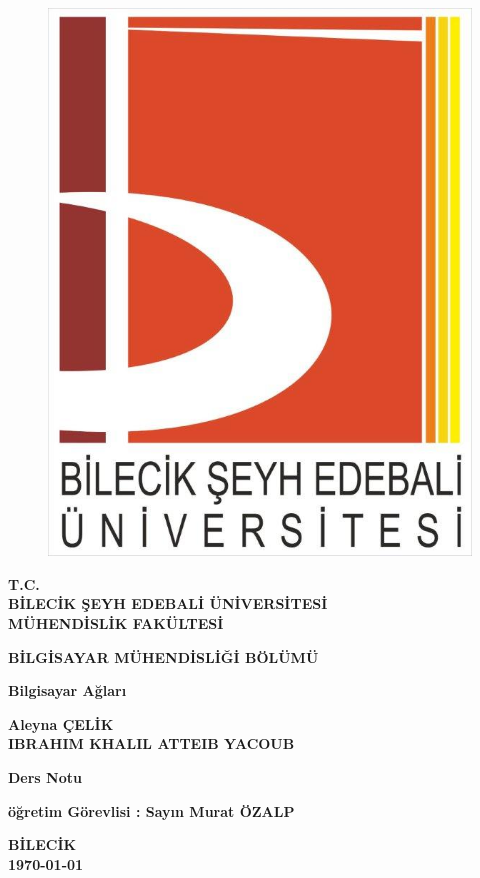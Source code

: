 \thispagestyle{empty} 
\begin{figure}[H]
\centering
\includegraphics[scale=0.2]{logomuz}
\end{figure}
\begin{center}
\textbf{T.C.}\\
\textbf{BİLECİK ŞEYH EDEBALİ ÜNİVERSİTESİ}\\
\textbf{MÜHENDİSLİK FAKÜLTESİ}

\textbf{BİLGİSAYAR MÜHENDİSLİĞİ BÖLÜMÜ}
\end{center}

\vspace*{4cm}
\begin{center}
\textbf{Bilgisayar Ağları}

\textbf{Aleyna ÇELİK}\\
\textbf{IBRAHIM KHALIL ATTEIB YACOUB}

\textbf{Ders Notu}
\end{center}

\vspace*{\fill}
\begin{center}
\textbf{öğretim Görevlisi : Sayın Murat ÖZALP}

\textbf{BİLECİK}\\ 
\textbf{\today}
\end{center}
